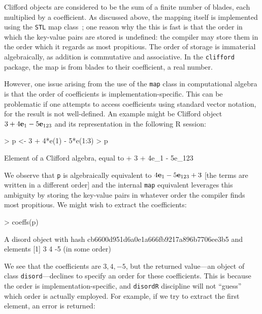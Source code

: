 \documentclass{birkjour}
\theoremstyle{definition}
\theoremstyle{remark}
\numberwithin{equation}{section}
\renewenvironment{Schunk}{\vspace{20pt}}{\vspace{20pt}}
\begin{document}
Clifford objects are considered to be the sum of a finite number of
blades, each multiplied by a coefficient.  As discussed above, the
mapping itself is implemented using the {\tt STL} map
class~\cite{musser2009}; one reason why the this is fast is that the
order in which the key-value pairs are stored is undefined: the
compiler may store them in the order which it regards as most
propitious.  The order of storage is immaterial algebraically, as
addition is commutative and associative.  In the {\tt clifford}
package, the map is from blades to their coefficient, a real number.

However, one issue arising from the use of the {\tt map} class in
computational algebra is that the order of coefficients is
implementation-specific.  This can be problematic if one attempts to
access coefficients using standard vector notation, for the result is
not well-defined.  An example might be Clifford object
$3+4{\bf e}_{1}-5{\bf e}_{123}$ and its representation in the following R
session:

\begin{Schunk}
\begin{Sinput}
> p <- 3 + 4*e(1) - 5*e(1:3)
> p
\end{Sinput}
\begin{Soutput}
Element of a Clifford algebra, equal to
+ 3 + 4e_1 - 5e_123
\end{Soutput}
\end{Schunk}
%
  We observe that {\tt p} is algebraically equivalent to
$4{\bf e}_{1}-5{\bf e}_{123}+3$ [the terms are written in a different order] and
the internal {\tt map} equivalent leverages this ambiguity by storing
the key-value pairs in whatever order the compiler finds most
propitious.  We might wish to extract the coefficients:

\begin{Schunk}
\begin{Sinput}
> coeffs(p)
\end{Sinput}
\begin{Soutput}
  A disord object with hash cb6600d951d6a0e1a666fb9217a896b7706ee3b5 and elements
[1]  3  4 -5
(in some order)
\end{Soutput}
\end{Schunk}
%
We see that the coefficients are $3,4,-5$, but the returned value---an
object of class {\tt disord}---declines to specify an order for these
coefficients.  This is because the order is implementation-specific,
and {\tt disordR} discipline will not ``guess'' which order is
actually employed.  For example, if we try to extract the first
element, an error is returned:
\end{document}
